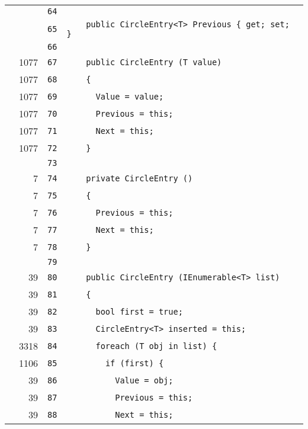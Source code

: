\documentclass[a4paper,10pt]{article}
\begin{document}
\begin{longtable}[l]{lrrl}
\cellcolor{gray} &  & \verb~64~ & \verb~~\\
\cellcolor{gray} &  & \verb~65~ & \verb~    public CircleEntry<T> Previous { get; set; }~\\
\cellcolor{gray} &  & \verb~66~ & \verb~~\\
\cellcolor{green} & 1077 & \verb~67~ & \verb~    public CircleEntry (T value)~\\
\cellcolor{green} & 1077 & \verb~68~ & \verb~    {~\\
\cellcolor{green} & 1077 & \verb~69~ & \verb~      Value = value;~\\
\cellcolor{green} & 1077 & \verb~70~ & \verb~      Previous = this;~\\
\cellcolor{green} & 1077 & \verb~71~ & \verb~      Next = this;~\\
\cellcolor{green} & 1077 & \verb~72~ & \verb~    }~\\
\cellcolor{gray} &  & \verb~73~ & \verb~~\\
\cellcolor{green} & 7 & \verb~74~ & \verb~    private CircleEntry ()~\\
\cellcolor{green} & 7 & \verb~75~ & \verb~    {~\\
\cellcolor{green} & 7 & \verb~76~ & \verb~      Previous = this;~\\
\cellcolor{green} & 7 & \verb~77~ & \verb~      Next = this;~\\
\cellcolor{green} & 7 & \verb~78~ & \verb~    }~\\
\cellcolor{gray} &  & \verb~79~ & \verb~~\\
\cellcolor{green} & 39 & \verb~80~ & \verb~    public CircleEntry (IEnumerable<T> list)~\\
\cellcolor{green} & 39 & \verb~81~ & \verb~    {~\\
\cellcolor{green} & 39 & \verb~82~ & \verb~      bool first = true;~\\
\cellcolor{green} & 39 & \verb~83~ & \verb~      CircleEntry<T> inserted = this;~\\
\cellcolor{green} & 3318 & \verb~84~ & \verb~      foreach (T obj in list) {~\\
\cellcolor{green} & 1106 & \verb~85~ & \verb~        if (first) {~\\
\cellcolor{green} & 39 & \verb~86~ & \verb~          Value = obj;~\\
\cellcolor{green} & 39 & \verb~87~ & \verb~          Previous = this;~\\
\cellcolor{green} & 39 & \verb~88~ & \verb~          Next = this;~\\

\end{longtable}
\end{document}
